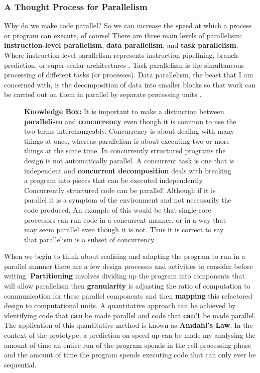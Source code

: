 \documentclass[11pt]{article} %
\begin{document}
\subsubsection{A Thought Process for Parallelism}
Why do we make code parallel? So we can increase the speed at which a process or program can execute, of course! There are three main levels of parallelism: {\bf instruction-level parallelism}, {\bf data parallelism}, and {\bf task parallelism}. Where instruction-level parallelism represents instruction pipelining, branch prediction, or super-scalar architectures \cite[Patterson, Hennessy, p41]{ref10}. Task parallelism is the simultaneous processing of different tasks (or processes). Data parallelism, the beast that I am concerned with, is the decomposition of data into smaller blocks so that work can be carried out on them in parallel by separate processing units \cite[Patterson, Hennessy, A-17]{ref10}.
\bigskip
\begin{figure}[h]
\begin{mdframed}
{\bf Knowledge Box:} It is important to make a distinction between {\bf parallelism} and {\bf concurrency} even though it is common to use the two terms interchangeably. Concurrency is about dealing with many things at once, whereas parallelism is about executing two or more things at the same time. In concurrently structured programs the design is not automatically parallel. A concurrent task is one that is independent and {\bf concurrent decomposition} deals with breaking a program into pieces that can be executed independently.  Concurrently structured code can be parallel! Although if it is parallel it is a symptom of the environment and not necessarily the code produced. An example of this would be that single-core processors can run code in a concurrent manner, or in a way that may seem parallel even though it is not. \cite{ref12} Thus it is correct to say that parallelism is a subset of concurrency. 
\end{mdframed}
\end{figure}
\bigskip
When we begin to think about realising and adapting the program to run in a parallel manner there are a few design processes and activities to consider before writing. {\bf Partitioning} involves dividing up the program into components that will allow parallelism then {\bf granularity} is adjusting the ratio of computation to communication for these parallel components and then {\bf mapping} this refactored design to computational units. \cite[p77,78]{ref9} A quantitative approach can be achieved by identifying code that {\bf can} be made parallel and code that {\bf can't} be made parallel. The application of this quantitative method is known as {\bf Amdahl's Law}. In the context of the prototype, a prediction on speed-up can be made my analysing the amount of time an entire run of the program spends in the cell processing phase and the amount of time the program spends executing code that can only ever be sequential.
\end{document}
